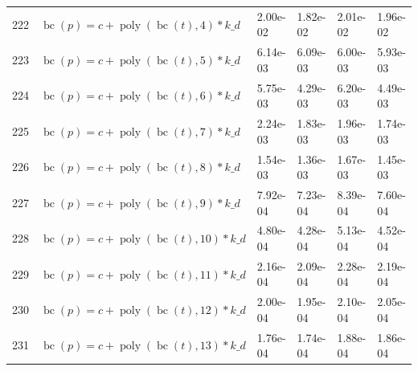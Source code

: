 \documentclass[12pt,a4paper]{article}
\DeclareMathOperator{\bc}{bc}
\DeclareMathOperator{\poly}{poly}
\begin{document}
\begin{longtable}[t]{ll>{\raggedleft\arraybackslash}p{2cm}>{\raggedleft\arraybackslash}p{2cm}>{\raggedleft\arraybackslash}p{2cm}>{\raggedleft\arraybackslash}p{2cm}}
222 & $\bc(p) = c + \poly\left( \bc(t), 4 \right) * k\_d$ & 2.00e-02 & 1.82e-02 & 2.01e-02 & 1.96e-02\\
\rowcolor{gray!6}  223 & $\bc(p) = c + \poly\left( \bc(t), 5 \right) * k\_d$ & 6.14e-03 & 6.09e-03 & 6.00e-03 & 5.93e-03\\
224 & $\bc(p) = c + \poly\left( \bc(t), 6 \right) * k\_d$ & 5.75e-03 & 4.29e-03 & 6.20e-03 & 4.49e-03\\
\rowcolor{gray!6}  225 & $\bc(p) = c + \poly\left( \bc(t), 7 \right) * k\_d$ & 2.24e-03 & 1.83e-03 & 1.96e-03 & 1.74e-03\\
226 & $\bc(p) = c + \poly\left( \bc(t), 8 \right) * k\_d$ & 1.54e-03 & 1.36e-03 & 1.67e-03 & 1.45e-03\\
\rowcolor{gray!6}  227 & $\bc(p) = c + \poly\left( \bc(t), 9 \right) * k\_d$ & 7.92e-04 & 7.23e-04 & 8.39e-04 & 7.60e-04\\
228 & $\bc(p) = c + \poly\left( \bc(t), 10 \right) * k\_d$ & 4.80e-04 & 4.28e-04 & 5.13e-04 & 4.52e-04\\
\rowcolor{gray!6}  229 & $\bc(p) = c + \poly\left( \bc(t), 11 \right) * k\_d$ & 2.16e-04 & 2.09e-04 & 2.28e-04 & 2.19e-04\\
230 & $\bc(p) = c + \poly\left( \bc(t), 12 \right) * k\_d$ & 2.00e-04 & 1.95e-04 & 2.10e-04 & 2.05e-04\\
\rowcolor{gray!6}  231 & $\bc(p) = c + \poly\left( \bc(t), 13 \right) * k\_d$ & 1.76e-04 & 1.74e-04 & 1.88e-04 & 1.86e-04\\*
\end{longtable}
\endgroup{}

\begingroup\fontsize{10}{12}\selectfont
\end{document}

